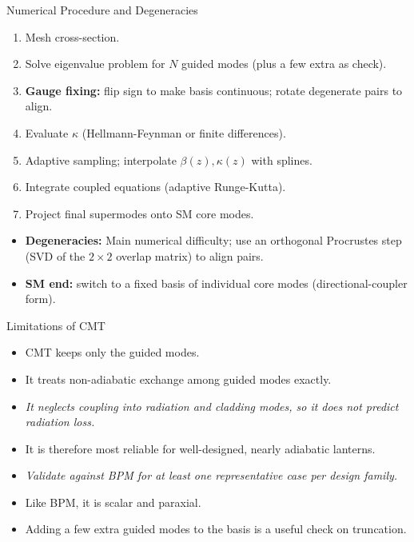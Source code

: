 \documentclass[aspectratio=169,10pt]{beamer}
\begin{document}
\begin{frame}{Numerical Procedure and Degeneracies}
\begin{enumerate}
    \item Mesh cross-section.
    \item Solve eigenvalue problem for \(N\) guided modes (plus a few extra as check).
    \item \textbf{Gauge fixing:} flip sign to make basis continuous; rotate degenerate pairs to align.
    \item Evaluate \(\kappa\) (Hellmann-Feynman or finite differences).
    \item Adaptive sampling; interpolate \(\beta(z), \kappa(z)\) with splines.
    \item Integrate coupled equations (adaptive Runge-Kutta).
    \item Project final supermodes onto SM core modes.
\end{enumerate}
\begin{itemize}
    \item \textbf{Degeneracies:} Main numerical difficulty; use an orthogonal Procrustes step (SVD of the \(2\times2\) overlap matrix) to align pairs.
    \item \textbf{SM end:} switch to a fixed basis of individual core modes (directional-coupler form).
\end{itemize}
\end{frame}

\begin{frame}{Limitations of CMT}
\begin{itemize}
    \item CMT keeps only the guided modes.
    \item It treats non-adiabatic exchange among guided modes exactly.
    \item \emph{It neglects coupling into radiation and cladding modes, so it does not predict radiation loss.}
    \item It is therefore most reliable for well-designed, nearly adiabatic lanterns.
    \item \emph{Validate against BPM for at least one representative case per design family.}
    \item Like BPM, it is scalar and paraxial.
    \item Adding a few extra guided modes to the basis is a useful check on truncation.
\end{itemize}
\end{frame}
\end{document}
